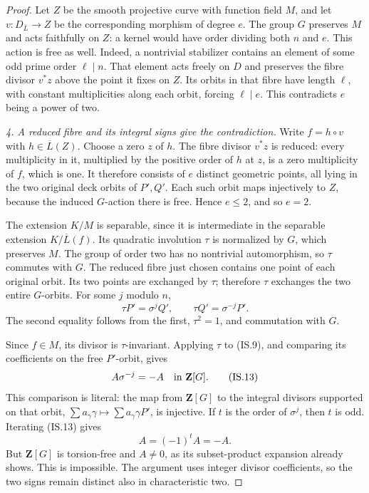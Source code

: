 \begin{proof}
Let $Z$ be the smooth projective curve with function field $M$,
and let $v:D_{\overline L}\to Z$ be the corresponding morphism
of degree $e$. The group $G$ preserves $M$ and acts faithfully
on $Z$: a kernel would have order dividing both $n$ and $e$.
This action is free as well. Indeed, a nontrivial stabilizer
contains an element of some odd prime order $\ell\mid n$.
That element acts freely on $D$ and preserves the fibre divisor
$v^*z$ above the point it fixes on $Z$. Its orbits in that fibre
have length $\ell$, with constant multiplicities along each
orbit, forcing $\ell\mid e$. This contradicts $e$ being a
power of two.

\emph{4. A reduced fibre and its integral signs give the contradiction.}
Write $f=h\circ v$ with $h\in\overline L(Z)$.
Choose a zero $z$ of $h$. The fibre divisor $v^*z$ is reduced:
every multiplicity in it, multiplied by the positive order of
$h$ at $z$, is a zero multiplicity of $f$, which is one.
It therefore consists of $e$ distinct geometric points, all
lying in the two original deck orbits of $P',Q'$.
Each such orbit maps injectively to $Z$, because the induced
$G$-action there is free. Hence $e\le2$, and so $e=2$.

The extension $K/M$ is separable, since it is intermediate in
the separable extension $K/\overline L(f)$. Its quadratic
involution $\tau$ is normalized by $G$, which preserves $M$.
The group of order two has no nontrivial automorphism, so
$\tau$ commutes with $G$.
The reduced fibre just chosen contains one point of each
original orbit. Its two points are exchanged by $\tau$;
therefore $\tau$ exchanges the two entire $G$-orbits.
For some $j$ modulo $n$,
\[
                  \tau P'=\sigma^jQ',\qquad
                  \tau Q'=\sigma^{-j}P'.
 \tag{IS.12}
\]
The second equality follows from the first, $\tau^2=1$,
and commutation with $G$.

Since $f\in M$, its divisor is $\tau$-invariant. Applying
$\tau$ to (IS.9), and comparing its coefficients on the free
$P'$-orbit, gives
\[
                         A\sigma^{-j}=-A
                                \quad\hbox{in }\mathbf Z[G].
 \tag{IS.13}
\]
This comparison is literal: the map from $\mathbf Z[G]$
to the integral divisors supported on that orbit,
$\sum a_\gamma\gamma\mapsto\sum a_\gamma\gamma P'$,
is injective. If $t$ is the order of $\sigma^j$, then $t$
is odd. Iterating (IS.13) gives
\[
                           A=(-1)^tA=-A.
\]
But $\mathbf Z[G]$ is torsion-free and $A\ne0$, as its
subset-product expansion already shows. This is impossible.
The argument uses integer divisor coefficients, so the two
signs remain distinct also in characteristic two.


\end{proof}
